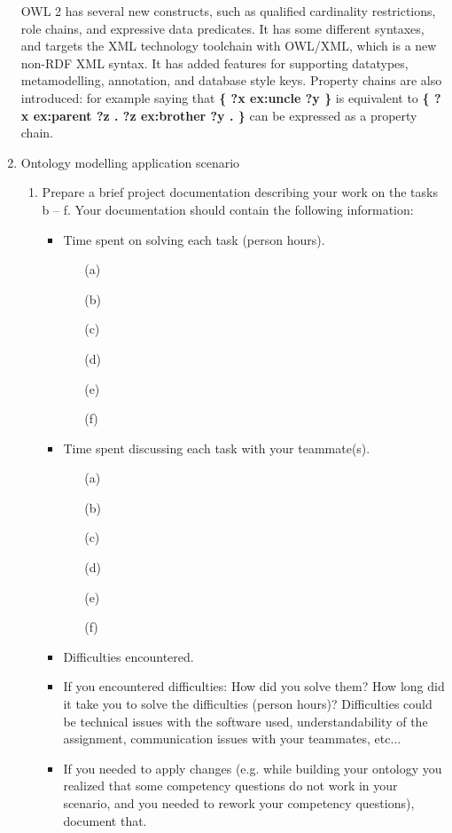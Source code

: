 \documentclass[10pt,a4paper]{article}
\begin{document}
\begin{enumerate}
OWL 2 has several new constructs, such as qualified cardinality restrictions, role chains, and expressive data predicates. It has some different syntaxes, and targets the XML technology toolchain with OWL/XML, which is a new non-RDF XML syntax. It has added features for supporting datatypes, metamodelling, annotation, and database style keys. Property chains are also introduced: for example saying that \textbf{\{ ?x ex:uncle ?y \}} is equivalent to \textbf{\{ ?x ex:parent ?z . ?z ex:brother ?y . \}} can be expressed as a property chain.

\item Ontology modelling application scenario

\begin{enumerate}

\item Prepare a brief project documentation describing your work on the tasks b – f.
Your documentation should contain the following information:
	\begin{itemize}
		\item Time spent on solving each task (person hours).
			\begin{enumerate}
			\item[(a)]
			\item[(b)]
			\item[(c)]
			\item[(d)]
			\item[(e)]
			\item[(f)]
			\end{enumerate}
		\item Time spent discussing each task with your teammate(s).
			\begin{enumerate}
			\item[(a)]
			\item[(b)]
			\item[(c)]
			\item[(d)]
			\item[(e)]
			\item[(f)]
			\end{enumerate}
		\item Difficulties encountered.
		\item If you encountered difficulties: How did you solve them? How long did it take you
to solve the difficulties (person hours)? Difficulties could be technical issues with
the software used, understandability of the assignment, communication issues
with your teammates, etc...
		\item If you needed to apply changes (e.g. while building your ontology you realized
that some competency questions do not work in your scenario, and you needed to
rework your competency questions), document that.
	\end{itemize}


\end{enumerate}
\end{enumerate}
\end{document}
